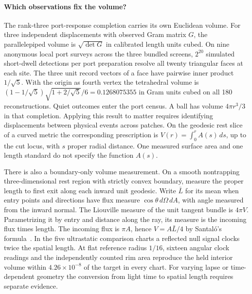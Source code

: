\documentclass[11pt]{article}
\begin{document}
\paragraph{Which observations fix the volume?}
The rank-three port-response completion carries its own Euclidean volume.
For three independent displacements with observed Gram matrix \(G\), the
parallelepiped volume is \(\sqrt{\det G}\) in calibrated length units cubed.
On nine anonymous local port surveys across the three bundled screens,
\(2^{20}\) simulated short-dwell detections per port preparation
resolve all twenty triangular faces at each site. The three unit record
vectors of a face have pairwise inner product \(1/\sqrt5\).
With the origin as fourth vertex the tetrahedral volume is
\((1-1/\sqrt5)\sqrt{1+2/\sqrt5}/6=0.1268075355\) in Gram units cubed
on all 180 reconstructions. Quiet outcomes enter the port census.
A ball has volume \(4\pi r^3/3\) in that completion. Applying this result to
matter requires identifying displacements between physical events across
patches. On the geodesic rest slice of a curved metric the corresponding
prescription is \(V(r)=\int_0^r A(s)\,ds\), up to the cut locus, with \(s\)
proper radial distance. One measured surface area and one length standard
do not specify the function \(A(s)\).

There is also a boundary-only volume measurement. On a smooth nontrapping
three-dimensional rest region with strictly convex boundary, measure the
proper length to first exit along each inward unit geodesic. Write \(\bar L\)
for its mean when entry points and directions have flux measure
\(\cos\theta\,d\Omega\,dA\), with angle measured from the inward normal.
The Liouville measure of the unit tangent bundle is \(4\pi V\). Parametrizing
it by entry and distance along the ray, its measure is the incoming flux
times length. The incoming flux is \(\pi A\), hence \(V=A\bar L/4\) by
Santal\'o's formula~\cite{pwsantalo2004integral}. In the five ultrastatic
comparison charts a reflected null signal clocks twice the spatial length.
At flat reference radius \(1/16\), sixteen angular clock readings and the
independently counted rim area reproduce the held interior volume within
\(4.26\times10^{-8}\) of the target in every chart. For varying lapse or
time-dependent geometry the conversion from light time to spatial length
requires separate evidence.
\end{document}

